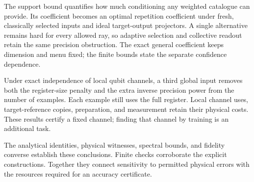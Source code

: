 \documentclass[11pt,a4paper]{article}
\numberwithin{equation}{section}
\begin{document}
The support bound quantifies how much conditioning any weighted catalogue can provide. Its coefficient becomes an optimal repetition coefficient under fresh, classically selected inputs and ideal target-output projectors. A single alternative remains hard for every allowed ray, so adaptive selection and collective readout retain the same precision obstruction. The exact general coefficient keeps dimension and menu fixed; the finite bounds state the separate confidence dependence.

Under exact independence of local qubit channels, a third global input removes both the register-size penalty and the extra inverse precision power from the number of examples. Each example still uses the full register. Local channel uses, target-reference copies, preparation, and measurement retain their physical costs. These results certify a fixed channel; finding that channel by training is an additional task.

The analytical identities, physical witnesses, spectral bounds, and fidelity converse establish these conclusions. Finite checks corroborate the explicit constructions. Together they connect sensitivity to permitted physical errors with the resources required for an accuracy certificate.
\end{document}
